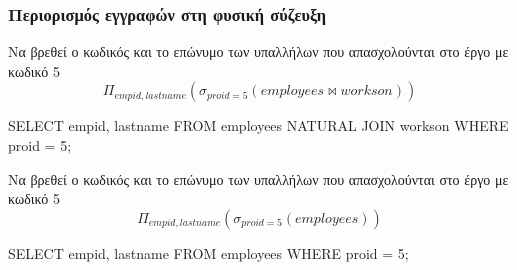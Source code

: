 \begin{frame}
\frametitle{Περιορισμός εγγραφών στη φυσική σύζευξη}
\begin{minipage}{\wE}
\vspace*{-0.5cm} 
\begin{exampleblock}{\small Να βρεθεί ο κωδικός και το επώνυμο των υπαλλήλων που απασχολούνται στο έργο με κωδικό 5}           
  \[ \Pi_{empid, lastname} \left( \sigma_{proid=5} (employees \bowtie workson) \right) \]
\vspace*{-0.5cm}  
\pause
\en
\begin{SQL}
  SELECT empid, lastname 
    FROM employees NATURAL JOIN workson
   WHERE proid = 5;
\end{SQL}
\end{exampleblock}
\pause
\begin{alertblock}{\small Να βρεθεί ο κωδικός και το επώνυμο των υπαλλήλων που απασχολούνται στο έργο με κωδικό 5}           
  \[ \Pi_{empid, lastname} \left( \sigma_{proid=5} (employees) \right) \]
\vspace*{-0.5cm}  
\en
\begin{SQL}
  SELECT empid, lastname 
    FROM employees
   WHERE proid = 5;
\end{SQL}
\end{alertblock}
\end{minipage}
\end{frame}


